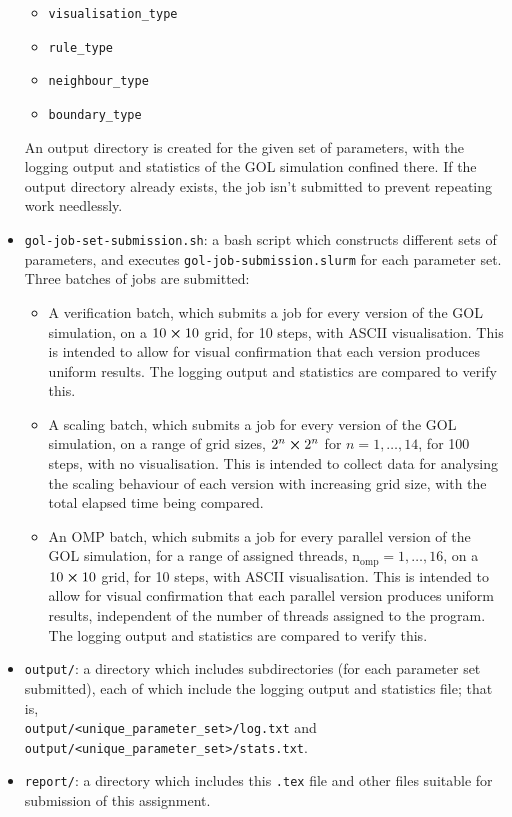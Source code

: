 \documentclass[draft]{article}
\begin{document}
\begin{itemize}
\begin{itemize}
  \item \lstinline{visualisation_type}

  \item \lstinline{rule_type}

  \item \lstinline{neighbour_type}

  \item \lstinline{boundary_type}
  \end{itemize}
  An output directory is created for the given set of parameters, with the
  logging output and statistics of the GOL simulation confined there.
  If the output directory already exists, the job isn't submitted to prevent
  repeating work needlessly.

\item \lstinline{gol-job-set-submission.sh}: a bash script which constructs
  different sets of parameters, and executes
  \lstinline{gol-job-submission.slurm} for each parameter set.
  Three batches of jobs are submitted:
  \begin{itemize}
  \item A verification batch, which submits a job for every version of the GOL
    simulation, on a $10\cross10$ grid, for 10 steps, with ASCII visualisation.
    This is intended to allow for visual confirmation that each version produces
    uniform results.
    The logging output and statistics are compared to verify this.

  \item A scaling batch, which submits a job for every version of the GOL
    simulation, on a range of grid sizes, $2^{n}\cross2^{n}$ for
    $n = 1, \dotsc, 14$, for 100 steps, with no visualisation.
    This is intended to collect data for analysing the scaling behaviour of each
    version with increasing grid size, with the total elapsed time being
    compared.

  \item An OMP batch, which submits a job for every parallel version of the GOL
    simulation, for a range of assigned threads,
    $\mathrm{n_{omp}} = 1, \dotsc, 16$, on a $10\cross10$ grid, for 10 steps,
    with ASCII visualisation.
    This is intended to allow for visual confirmation that each parallel version
    produces uniform results, independent of the number of threads assigned to
    the program.
    The logging output and statistics are compared to verify this.
  \end{itemize}

\item \lstinline{output/}: a directory which includes subdirectories (for each
  parameter set submitted), each of which include the logging output and
  statistics file; that is, \\ \lstinline{output/<unique_parameter_set>/log.txt}
  and \\ \lstinline{output/<unique_parameter_set>/stats.txt}.

\item \lstinline{report/}: a directory which includes this \lstinline{.tex} file
  and other files suitable for submission of this assignment.
\end{itemize}
\end{document}

